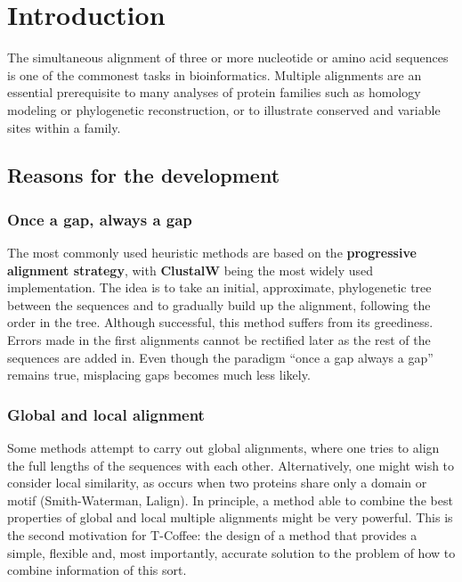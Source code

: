 \section{Introduction}
The simultaneous alignment of three or more nucleotide or amino acid sequences is one of the commonest tasks in bioinformatics.
Multiple alignments are an essential prerequisite to many analyses of protein families such as homology modeling or phylogenetic reconstruction, or to illustrate conserved and variable sites within a family.

\subsection{Reasons for the development}
\subsubsection{Once a gap, always a gap}
The most commonly used heuristic methods are based on the \textbf{progressive alignment strategy}, with \textbf{ClustalW} being the most widely used implementation.
The idea is to take an initial, approximate, phylogenetic tree between the sequences and to gradually build up the alignment, following the order in the tree. Although successful, this method suffers from its greediness.
Errors made in the first alignments cannot be rectified later as the rest of the sequences are added in.
Even though the paradigm ``once a gap always a gap'' remains true, misplacing gaps becomes much less likely.

\subsubsection{Global and local alignment}
Some methods attempt to carry out global alignments, where one tries to align the full lengths of the sequences with each other. Alternatively, one might wish to consider local similarity, as occurs when two proteins share only a domain or motif (Smith-Waterman, Lalign).
In principle, a method able to combine the best properties of global and local multiple alignments might be very powerful.
This is the second motivation for T-Coffee: the design of a method that provides a simple, flexible and, most importantly, accurate solution to the problem of how to combine information of this sort.

